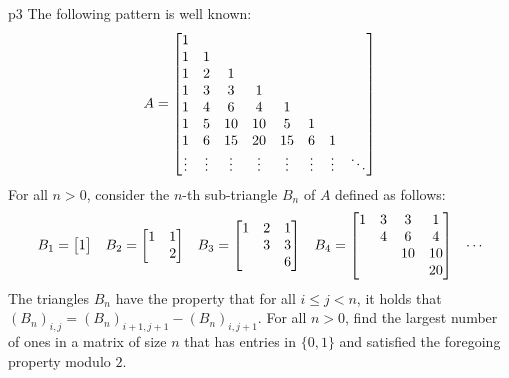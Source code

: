 \documentclass[a4paper, 11pt]{article}
\begin{document}
\begin{problem}{%
	}{p3%
	}
The following pattern is well known: $$A=\left[\begin{matrix}1 & \\ 1 & 1&\\ 1&2 &1 & \\ 1 & 3 & 3 & 1 &\\ 1 & 4 & 6 & 4 & 1&\\ 1 & 5 & 10 & 10 & 5 &1 & \\ 1 & 6 & 15 & 20 & 15& 6 & 1 &\\ \vdots & \vdots & \vdots & \vdots & \vdots &\vdots & \vdots & \ddots \end{matrix}\right]$$For all $n>0$, consider the $n$-th sub-triangle $B_n$ of $A$ defined as follows:\begin{align*}
	B_1=\left[\begin{matrix}1\end{matrix}\right] && B_2=\left[\begin{matrix}1 &1\\ &2\end{matrix}\right] && B_3=\left[\begin{matrix}1 & 2& 1\\ & 3 &3\\ & & 6\end{matrix}\right] && B_4 =\left[\begin{matrix}1 &3 & 3 &1\\ & 4 & 6 & 4\\ & & 10 & 10\\ &&&20\end{matrix}\right] && \cdots 
\end{align*}The triangles $B_n$ have the property that for all $i\leq j<n$, it holds that $(B_n)_{i,j}= (B_n)_{i+1,j+1}-(B_n)_{i,j+1}$. For all $n>0$, find the largest number of ones in a matrix of size $n$ that has entries in $\{0,1\}$ and satisfied the foregoing property modulo $2$.
\end{problem}
\end{document}
